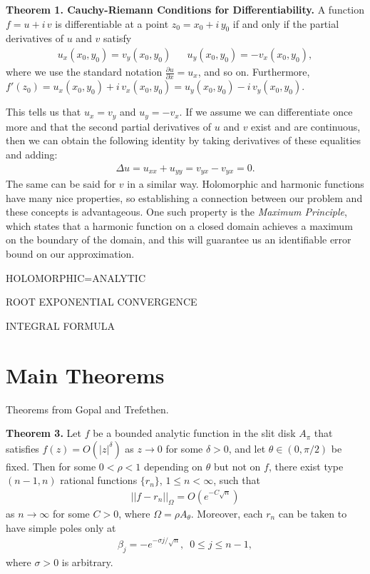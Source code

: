 \documentclass[12]{article}
\begin{document}
	\textbf{Theorem 1. Cauchy-Riemann Conditions for Differentiability.} A function $f=u+i\,v$ is differentiable at a point $z_0=x_0+i\,y_0$ if and only if the partial derivatives of $u$ and $v$ satisfy
	\begin{align*}
u_x(x_0,y_0)=v_y(x_0,y_0) &&
u_y	(x_0,y_0)=-v_x(x_0,y_0),
	\end{align*}
where we use the standard notation $\frac{\partial u}{\partial x}=u_x$, and so on. Furthermore, $f'(z_0)=u_x(x_0,y_0)+i\, v_x(x_0,y_0)=u_y	(x_0,y_0)-i\, v_y(x_0,y_0)$.

	This tells us that $u_x=v_y$ and $u_y=-v_x$. If we assume we can differentiate once more and that the second partial derivatives of $u$ and $v$ exist and are continuous, then we can obtain the following identity by taking derivatives of these equalities and adding:
	\begin{align*}
\Delta u=u_{xx}+u_{yy}=v_{yx}-v_{yx}=0.
	\end{align*}
The same can be said for $v$ in a similar way. Holomorphic and harmonic functions have many nice properties, so establishing a connection between our problem and these concepts is advantageous. One such property is the \textit{Maximum Principle}, which states that a harmonic function on a closed domain achieves a maximum on the boundary of the domain, and this will guarantee us an identifiable error bound on our approximation. 

	HOLOMORPHIC=ANALYTIC
	
	ROOT EXPONENTIAL CONVERGENCE
	
	INTEGRAL FORMULA
	
		
	\section{Main Theorems}
	Theorems from Gopal and Trefethen.
	
	\textbf{Theorem 3.} Let $f$ be a bounded analytic function in the slit disk $A_\pi$ that satisfies $f(z)=O(|z|^\delta)$ as $z \to 0$ for some $\delta > 0$, and let $\theta \in (0,\pi /2)$ be fixed. Then for some $0< \rho < 1$ depending on $\theta$ but not on $f$, there exist type $(n-1,n)$ rational functions $\{r_n\}$, $1 \leq n < \infty$, such that
	\begin{align*}
||f-r_n||_\Omega = O(e^{-C \sqrt{n}})
	\end{align*}
as $n \to \infty $ for some $C>0$, where $\Omega = \rho A_\theta$. Moreover, each $r_n$ can be taken to have simple poles only at
	\begin{align*}
\beta_j = -e^{-\sigma j/\sqrt{n}}, \enspace 0\leq j \leq n-1,
	\end{align*}
where $\sigma >0$ is arbitrary.
\end{document}
